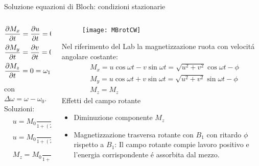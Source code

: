 \begin{frame}{Soluzione equazioni di Bloch: condizioni stazionarie}
    \begin{columns}[T]
    \begin{column}{0.5\textwidth}
    \begin{align*}
    &\PDy{t}{M_x}=\PDy{t}{u}=0=\frac{-u}{T_2}+v\Delta\omega\\
    &\PDy{t}{M_y}=\PDy{t}{v}=0=\frac{-v}{T_2}-u\Delta\omega-\omega_1M_z\\
    &\PDy{t}{M_z}=0=\omega_1v+\frac{M_z-M_0}{T_1}\\
    \end{align*}
    con $\Delta\omega=\omega-\omega_0$. Soluzioni:
    \begin{align*}
    &u=M_0\frac{\omega_1\Delta\omega T_2^2}{1+(T_2\Delta\omega)^2+\omega_1^2T_1T_2}\\
    &u=M_0\frac{\omega_1T_2}{1+(T_2\Delta\omega)^2+\omega_1^2T_1T_2}\\
    &M_z=M_0\frac{1+(T_2\Delta\omega)^2}{1+(T_2\Delta\omega)^2+\omega_1^2T_1T_2}\\
    \end{align*}
    \end{column}
    \begin{column}{0.5\textwidth}
    \begin{figure}
        \centering
        \texttt{[image: MBrotCW]}
        \label{fig:MBrotCW}
    \end{figure}
    Nel riferimento del Lab la magnetizzazione ruota con velocit\'a angolare costante:
    \begin{align*}
    &M_x=u\cos{\omega t}-v\sin{\omega t}=\sqrt{u^2+v^2}\cos{\omega t-\phi}\\
    &M_y=u\cos{\omega t}+v\sin{\omega t}=\sqrt{u^2+v^2}\sin{\omega t-\phi}\\
    &M_z=M_z
    \end{align*}
    Effetti del campo rotante
    \begin{itemize}
        \item Diminuzione componente $M_z$
        \item Magnetizzazione trasversa rotante con $B_1$ con ritardo $\phi$ rispetto a $B_1$: Il campo rotante compie lavoro positivo e l'energia corrispondente \'e assorbita dal mezzo.
    \end{itemize}
    \end{column}
    \end{columns}
\end{frame}

